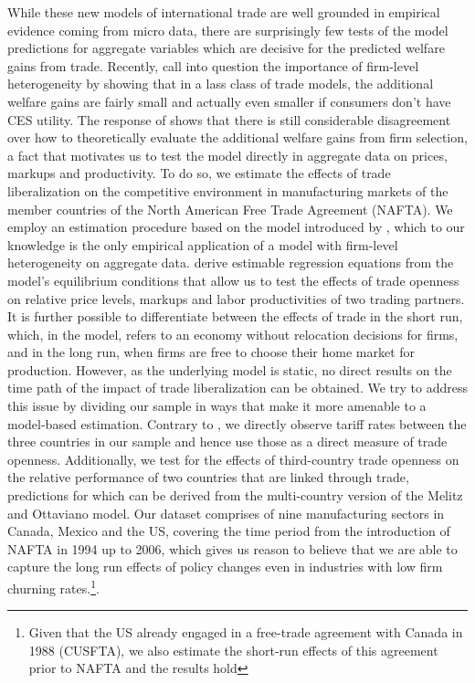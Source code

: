 \documentclass[a4paper,12pt]{article}
\begin{document}
While these new models of international trade are well grounded in empirical evidence coming from micro data, there are surprisingly few tests of the model predictions for aggregate variables which are decisive for the predicted welfare gains from trade. Recently, \citet{Arkolakisetal2012a,Arkolakisetal2012b} call into question the importance of firm-level heterogeneity by showing that in a lass class of trade models, the additional welfare gains are fairly small and actually even smaller if consumers don't have CES utility. The response of \citet{MelitzRedding2013} shows that there is still considerable disagreement over how to theoretically evaluate the additional welfare gains from firm selection, a fact that motivates us to test the model directly in aggregate data on prices, markups and productivity. To do so, we estimate the effects of trade liberalization on the competitive environment in manufacturing markets of the member countries of the North American Free Trade Agreement (NAFTA). We employ an estimation procedure based on the \citet{MelitzOttaviano2008} model introduced by \citet{Chen2009}, which to our knowledge is the only empirical application of a model with firm-level heterogeneity on aggregate data. \citet{Chen2009} derive estimable regression equations from the model's equilibrium conditions that allow us to test the effects of trade openness on relative price levels, markups and labor productivities of two trading partners. It is further possible to differentiate between the effects of trade in the short run, which, in the model, refers to an economy without relocation decisions for firms, and in the long run, when firms are free to choose their home market for production. However, as the underlying model is static, no direct results on the time path of the impact of trade liberalization can be obtained. We try to address this issue by dividing our sample in ways that make it more amenable to a model-based estimation. Contrary to \citet{Chen2009}, we directly observe tariff rates between the three countries in our sample and hence use those as a direct measure of trade openness. Additionally, we test for the effects of third-country trade openness on the relative performance of two countries that are linked through trade, predictions for which can be derived from the multi-country version of the Melitz and Ottaviano model. Our dataset comprises of nine manufacturing sectors in Canada, Mexico and the US, covering the time period from the introduction of NAFTA in 1994 up to 2006, which gives us reason to believe that we are able to capture the long run effects of policy changes even in industries with low firm churning rates.\footnote{Given that the US already engaged in a free-trade agreement with Canada in 1988 (CUSFTA), we also estimate the short-run effects of this agreement prior to NAFTA and the results hold}. \\
\end{document}
